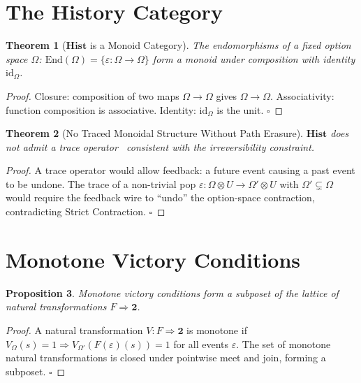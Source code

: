 \documentclass[11pt,a4paper,openany]{book}
\theoremstyle{plain}
\newtheorem{theorem}{Theorem}[chapter]
\newtheorem{proposition}[theorem]{Proposition}
\theoremstyle{definition}
\theoremstyle{remark}
\begin{document}
\section{The History Category}

\begin{theorem}[$\mathbf{Hist}$ is a Monoid Category]
  The endomorphisms of a fixed option space $\Omega$:
  $\mathrm{End}(\Omega) = \{\varepsilon : \Omega \to \Omega\}$
  form a monoid under composition with identity $\mathrm{id}_\Omega$.
\end{theorem}
\begin{proof}
  Closure: composition of two maps $\Omega \to \Omega$ gives
  $\Omega \to \Omega$. Associativity: function composition is
  associative. Identity: $\mathrm{id}_\Omega$ is the unit. $\square$
\end{proof}

\begin{theorem}[No Traced Monoidal Structure Without Path Erasure]
  $\mathbf{Hist}$ does not admit a trace operator~\cite{JoyalStreetVerity}
  consistent with the irreversibility constraint.
\end{theorem}
\begin{proof}
  A trace operator would allow feedback: a future event causing a past
  event to be undone. The trace of a non-trivial pop
  $\varepsilon : \Omega \otimes U \to \Omega' \otimes U$ with
  $\Omega' \subsetneq \Omega$ would require the feedback wire to
  ``undo'' the option-space contraction, contradicting Strict Contraction.
  $\square$
\end{proof}

\section{Monotone Victory Conditions}

\begin{proposition}
  Monotone victory conditions form a subposet of the lattice of natural
  transformations $F \Rightarrow \mathbf{2}$.
\end{proposition}
\begin{proof}
  A natural transformation $V : F \Rightarrow \mathbf{2}$ is monotone
  if $V_\Omega(s)=1 \Rightarrow V_{\Omega'}(F(\varepsilon)(s))=1$
  for all events $\varepsilon$. The set of monotone natural
  transformations is closed under pointwise meet and join, forming
  a subposet. $\square$
\end{proof}

\end{document}

